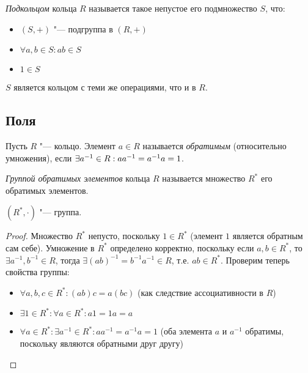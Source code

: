 \begin{definition}
	\textit{Подкольцом} кольца $R$ называется такое непустое его подмножество $S$, что:
	\begin{itemize}
		\item $(S, +)$ "--- подгруппа в $(R, +)$
		\item $\forall a, b \in S: ab \in S$
		\item $1 \in S$
	\end{itemize}

$S$ является кольцом с теми же операциями, что и в $R$.
\end{definition}

\subsection{Поля}

\begin{definition}
	Пусть $R$ "--- кольцо. Элемент $a \in R$ называется \textit{обратимым} (относительно умножения), если $\exists a^{-1} \in R: aa^{-1} \hm{=} a^{-1}a = 1$.
\end{definition}

\begin{definition}
	\textit{Группой обратимых элементов} кольца $R$ называется множество $R^*$ его обратимых элементов.
\end{definition}

\begin{proposition}
	$(R^*, \cdot)$ "--- группа.
\end{proposition}

\begin{proof} Множество $R^*$ непусто, поскольку $1 \in R^*$ (элемент $1$ является обратным сам себе). Умножение в $R^*$ определено корректно, поскольку если $a, b \in R^*$, то $\exists a^{-1}, b^{-1} \in R$, тогда $\exists (ab)^{-1} = b^{-1}a^{-1} \in R$, т.\:е. $ab \in R^*$. Проверим теперь свойства группы:
	\begin{itemize}
		\item $\forall a, b, c \in R^*: (ab)c = a(bc)$ (как следствие ассоциативности в $R$)
		\item $\exists 1 \in R^*: \forall a \in R^*: a1 = 1a = a$
		\item $\forall a \in R^*: \exists a^{-1} \in R^*: aa^{-1} = a^{-1}a = 1$ (оба элемента $a$ и $a^{-1}$ обратимы, поскольку являются обратными друг другу)
	\end{itemize}
\end{proof}

